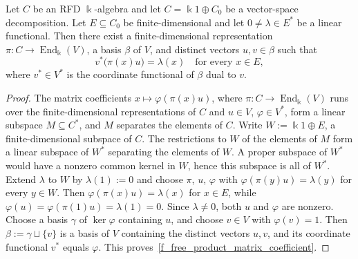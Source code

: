 \begin{lemma}\label{lemma_matrix_coefficient_separation}
    Let \(C\) be an RFD \(\Bbbk\)-algebra and let \(C=\Bbbk 1\oplus C_0\) be a vector-space decomposition. Let \(E\subseteq C_0\) be finite-dimensional and let \(0\neq\lambda\in E^*\) be a linear functional. Then there exist a finite-dimensional representation \(\pi\colon C\to\operatorname{End}_{\Bbbk}(V)\), a basis \(\beta\) of \(V\), and distinct vectors \(u,v\in\beta\) such that
    \begin{equation}\label{f_free_product_matrix_coefficient}
        v^*\bigl(\pi(x)u\bigr)=\lambda(x)\quad\text{for every }x\in E,
    \end{equation}
    where \(v^*\in V^*\) is the coordinate functional of \(\beta\) dual to \(v\).
\end{lemma}
\begin{proof}
    The matrix coefficients \(x\mapsto\varphi(\pi(x)u)\), where \(\pi\colon C\to\operatorname{End}_{\Bbbk}(V)\) runs over the finite-dimensional representations of \(C\) and \(u\in V\), \(\varphi\in V^*\), form a linear subspace \(M\subseteq C^*\), and \(M\) separates the elements of \(C\). Write \(W:=\Bbbk 1\oplus E\), a finite-dimensional subspace of \(C\). The restrictions to \(W\) of the elements of \(M\) form a linear subspace of \(W^*\) separating the elements of \(W\). A proper subspace of \(W^*\) would have a nonzero common kernel in \(W\), hence this subspace is all of \(W^*\). Extend \(\lambda\) to \(W\) by \(\lambda(1):=0\) and choose \(\pi\), \(u\), \(\varphi\) with \(\varphi(\pi(y)u)=\lambda(y)\) for every \(y\in W\). Then \(\varphi(\pi(x)u)=\lambda(x)\) for \(x\in E\), while \(\varphi(u)=\varphi(\pi(1)u)=\lambda(1)=0\). Since \(\lambda\neq0\), both \(u\) and \(\varphi\) are nonzero. Choose a basis \(\gamma\) of \(\ker\varphi\) containing \(u\), and choose \(v\in V\) with \(\varphi(v)=1\). Then \(\beta:=\gamma\sqcup\{v\}\) is a basis of \(V\) containing the distinct vectors \(u,v\), and its coordinate functional \(v^*\) equals \(\varphi\). This proves~\eqref{f_free_product_matrix_coefficient}.
\end{proof}

